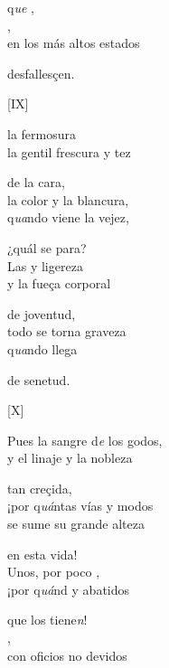 \documentclass[11pt,a4paper,twoside]{article}
\begin{document}
{q\textit{ue} ,\\
,\\
en los más altos estados

desfallesçen.
\pend

\begin{center}
	[IX]
\end{center}
\pstart
{} la fermosura\\
la gentil frescura y tez

de la cara,\\
la color y la blancura,\\
q\textit{ua}ndo viene la vejez,

¿quál se para?\\
Las  y ligereza\\
y la fueça corporal

de joventud,\\
todo se torna graveza\\
q\textit{ua}ndo llega  

de senetud.
\pend

\begin{center}
	[X]
\end{center}
\pstart
Pues la sangre d\textit{e} los godos,\\
y el linaje y la nobleza

tan creçida,\\
¡por q\textit{uá}ntas vías y modos\\
se sume su grande alteza

en esta vida!\\
Unos, por poco ,\\
¡por q\textit{uá}nd  y abatidos

que los tiene\textit{n}!\\
,\\
con oficios no devidos

}
\end{document}
